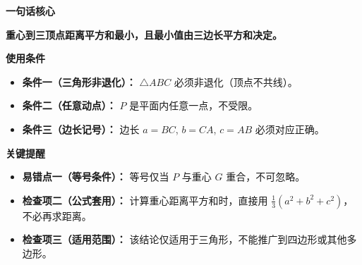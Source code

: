 \begin{summarybox}
	\textbf{\textcolor{CSummary}{一句话核心}}

	\textbf{重心到三顶点距离平方和最小，且最小值由三边长平方和决定。}

	\medskip
	\textbf{\textcolor{CSummary}{使用条件}}
	\begin{itemize}[leftmargin=*, itemsep=0.5em, topsep=0.4em]
		\item \textbf{条件一（三角形非退化）：} $\triangle ABC$ 必须非退化（顶点不共线）。
		\item \textbf{条件二（任意动点）：} $P$ 是平面内任意一点，不受限。
		\item \textbf{条件三（边长记号）：} 边长 $a=BC$, $b=CA$, $c=AB$ 必须对应正确。
	\end{itemize}

	\medskip
	\textbf{\textcolor{CSummary}{关键提醒}}
	\begin{itemize}[leftmargin=*, itemsep=0.5em, topsep=0.4em]
		\item \textbf{易错点一（等号条件）：} 等号仅当 $P$ 与重心 $G$ 重合，不可忽略。
		\item \textbf{检查项二（公式套用）：} 计算重心距离平方和时，直接用 $\frac13(a^2+b^2+c^2)$，不必再求距离。
		\item \textbf{检查项三（适用范围）：} 该结论仅适用于三角形，不能推广到四边形或其他多边形。
	\end{itemize}
\end{summarybox}
